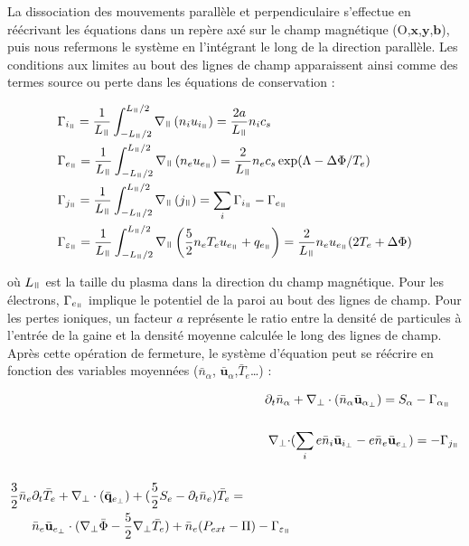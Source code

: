 \begin{refsection}
La dissociation des mouvements parallèle et perpendiculaire s'effectue
en réécrivant les équations dans un repère axé sur le champ magnétique
(O,$\mathbf x$,$\mathbf y$,$\mathbf b$), puis nous refermons le
système en l'intégrant le long de la direction parallèle. Les conditions aux
limites au bout des lignes de champ apparaissent ainsi comme des termes source
ou perte dans les équations de conservation :

\begin{align}
\label{3-vitessesBord}
\begin{split}
\Gamma&_{i_\para}=\frac{1}{L_\para}\int_{-L_\para/2}^{L_\para/2}\nabla_\para\left(n_iu_{i_\para}\right)=\frac{2a}{L_\para}n_ic_s\\
\Gamma&_{e_\para}=\frac{1}{L_\para}\int_{-L_\para/2}^{L_\para/2}\nabla_\para\left(n_eu_{e_\para}\right)=\frac{2}{L_\para}n_ec_s
\exp(\Lambda-\Delta \Phi/T_e)\\
\Gamma&_{j_\para}=\frac{1}{L_\para}\int_{-L_\para/2}^{L_\para/2}\nabla_\para\left(j_\para\right)=\sum_i\Gamma_{i_\para}-\Gamma_{e_\para}\\
\Gamma&_{\varepsilon_\para}=\frac{1}{L_\para}
\int_{-L_\para/2}^{L_\para/2}\nabla_\para
\left(\frac{5}{2}n_eT_eu_{e_\para}+q_{e_\para}\right)
=\frac{2}{L_\para}n_eu_{e_\para}(2T_e+\Delta \Phi)
\end{split}
\end{align}

où $L_\para$ est la taille du plasma dans la direction du champ magnétique. Pour
les électrons, $\Gamma_{e_\para}$ implique le potentiel de la paroi au bout des
lignes de champ. Pour les pertes ioniques, un facteur $a$ représente le ratio
entre la densité de particules à l'entrée de la gaine et la densité moyenne
calculée le long des lignes de champ. Après cette opération de fermeture,
le système d'équation peut se réécrire en fonction des variables moyennées
($\bar{n}_\alpha$, $\bar{\mathbf u}_\alpha$,$\bar{T}_e$\ldots) :

\begin{align}
\label{3-equations2D1}
\partial_t \bar{n}_\alpha& +
\nabla_\perp\cdot\left(\bar{n}_\alpha\bar{\mathbf{u}}_{\alpha_\perp}\right)=S_\alpha
- \Gamma_{\alpha_\para}\\[0.5cm]
\nabla_\perp\cdot&(\sum_ie\bar{n}_i\bar{\mathbf{u}}_{i_\perp}
-e\bar{n}_e\bar{\mathbf{u}}_{e_\perp})= - \Gamma_{j_\para}\\[0.5cm]
\begin{split}\frac{3}{2}\bar{n}_e&\partial_t\bar{T}_e +
\nabla_\perp\cdot(\bar{\mathbf{q}}_{e_\perp}) +
(\frac{5}{2}S_e-\partial_t\bar{n}_e)\bar{T}_e =\\
&\bar{n}_e\bar{\mathbf{u}}_{e_\perp}\cdot(\nabla_\perp
\bar{\Phi}-\frac{5}{2}\nabla_\perp
\bar{T}_e)+\bar{n}_e(P_{ext}-\Pi)-\Gamma_{\varepsilon_\para}
\label{3-equations2D2}
\end{split}
\end{align}


\end{refsection}
